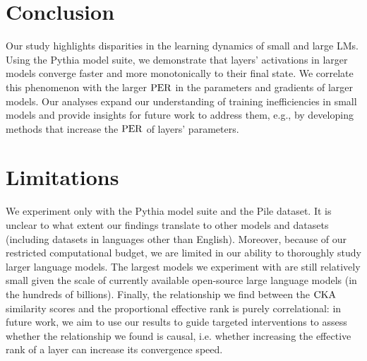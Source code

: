 \section{Conclusion}\label{sec:conclusion}

Our study highlights disparities in the learning dynamics of small and large LMs. Using the Pythia model suite, we demonstrate that layers' activations in larger models converge faster and more monotonically to their final state.
We correlate this phenomenon with the larger $\mathrm{PER}$ in the parameters and gradients of larger models. 
Our analyses expand our understanding of training inefficiencies in small models and provide insights for future work to address them, e.g., by developing methods that increase the $\mathrm{PER}$ of layers’ parameters.

\section*{Limitations}\label{sec:limitations}

We experiment only with the Pythia model suite and the Pile dataset. It is unclear to what extent our findings translate to other models and datasets (including datasets in languages other than English). Moreover, because of our restricted computational budget, we are limited in our ability to thoroughly study larger language models. 
The largest models we experiment with are still relatively small given the scale of currently available open-source large language models (in the hundreds of billions). Finally, the relationship we find between the $\mathrm{CKA}$ similarity scores and the proportional effective rank is purely correlational: in future work, we aim to use our results to guide targeted interventions to assess whether the relationship we found is causal, i.e. whether increasing the effective rank of a layer can increase its convergence speed.